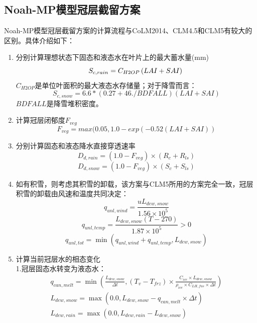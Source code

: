 \subsection{Noah-MP模型冠层截留方案}
Noah-MP模型冠层截留方案的计算流程与CoLM2014、CLM4.5和CLM5有较大的区别。具体介绍如下：
\begin{enumerate}
\item 分别计算理想状态下固态和液态水在叶片上的最大蓄水量(mm)\\
\begin{equation}
S_{c,rain}=C_{H2OP}\left(LAI+SAI\right)\\
\end{equation}
$C_{H2OP}$是单位叶面积的最大液态水存储量；对于降雪而言：
\begin{equation}
S_{c,snow}= 6.6*\left(0.27+46./BDFALL\right) \left(LAI+SAI\right)
\end{equation}
$BDFALL$是降雪堆积密度。
\item 计算冠层闭郁度$F_{veg}$
\begin{equation}
F_{veg} =max(0.05,1.0-exp(-0.52\left(LAI+SAI\right))
\end{equation}
\item 分别计算固态和液态降水直接穿透速率
\begin{equation}
D_{d,rain}=\left(1.0-F_{veg}\right) \times (R_{c}+R_{ls})
\end{equation}
\begin{equation}
D_{d,snow}=\left(1.0-F_{veg}\right) \times (S_{c}+S_{ls})
\end{equation}
\item 如有积雪，则考虑其积雪的卸载，该方案与CLM5所用的方案完全一致，冠层积雪的卸载由风速和温度共同决定：
\begin{equation}
q_{unl, wind}=\frac{u L_{dew, snow}}{1.56 \times 10^{5}}
\end{equation}
\begin{equation}
q_{unl, temp}=\frac{L_{dew, snow}(T-270)}{1.87 \times 10^{5}}>0
\end{equation}
\begin{equation}
q_{unl, tot}=\min \left(q_{unl, wind}+q_{unl, temp}, L_{dew, snow}\right)
\end{equation}
\item 计算当前冠层水的相态变化\\
1.冠层固态水转变为液态水：
\begin{equation}
\begin{array}{c}q_{c a n, m e l t}=\min \left(\frac{L_{dew,snow}}{\Delta t},\left(T_{v}-T_{f r z}\right) \times \frac{C_{i c e} \times L_{dew,snow}}{\rho_{i c e} \times C_{L H, f u s} \times \Delta t}\right) \\ L_{dew,snow}=\max \left(0.0, L_{dew,snow}-q_{c a n, m e l t} \times \Delta t\right) \\ L_{dew,rain }=\max \left(0.0, L_{dew,rain}-L_{dew,snow}\right)\end{array}

\end{equation}
\end{enumerate}
